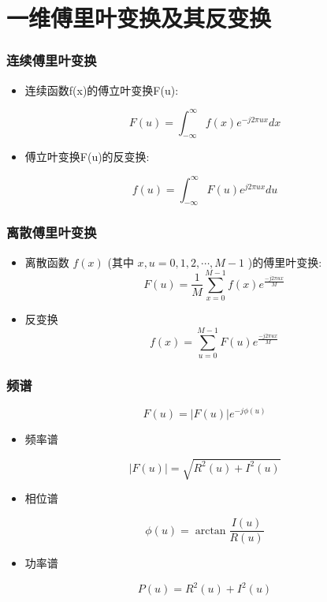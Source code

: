 \documentclass{beamer}
\begin{document}
\section{一维傅里叶变换及其反变换}
\label{sec-2}
\begin{frame}
\frametitle{连续傅里叶变换}
\label{sec-2-1}

\begin{itemize}
\item 连续函数f(x)的傅立叶变换F(u):
\end{itemize}
\[ F(u) = \int_{-\infty}^{\infty}f(x) e^{-j2\pi ux}dx \]
\begin{itemize}
\item 傅立叶变换F(u)的反变换:
\end{itemize}
\[ f(u) = \int_{-\infty}^{\infty}F(u) e^{j2\pi ux}du \]
\end{frame}
\begin{frame}
\frametitle{离散傅里叶变换}
\label{sec-2-2}

\begin{itemize}
\item 离散函数 $f(x)$ (其中 $x,u=0,1,2,\cdots,M-1$ )的傅里叶变换:
  \[ F(u) = \frac{1}{M}\sum_{x=0}^{M-1}f(x)e^{\frac{-j2\pi u x}{M}}\]
\item 反变换
  \[ f(x) = \sum_{u=0}^{M-1}F(u)e^{\frac{-j2\pi u x}{M}}\]
\end{itemize}
\end{frame}
\begin{frame}
\frametitle{频谱}
\label{sec-2-3}

\[ F(u) = |F(u)|e^{-j\phi(u)} \]
\begin{itemize}
\item 频率谱
\end{itemize}
\[ |F(u)| =\sqrt{R^2(u)+I^2(u)} \]
\begin{itemize}
\item 相位谱
\end{itemize}
\[ \phi(u) = \arctan\frac{I(u)}{R(u)} \]
\begin{itemize}
\item 功率谱
\end{itemize}
\[ P(u) =R^2(u)+I^2(u) \]
\end{frame}
\end{document}
